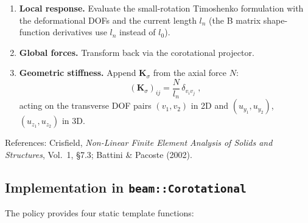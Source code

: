 \begin{enumerate}
  \item \textbf{Local response.}  Evaluate the small-rotation
    Timoshenko formulation with the deformational DOFs and the
    current length $l_n$ (the B matrix shape-function derivatives
    use $l_n$ instead of $l_0$).

  \item \textbf{Global forces.}  Transform back via the corotational
    projector.

  \item \textbf{Geometric stiffness.}  Append
    $\mathbf{K}_\sigma$ from the axial force $N$:
    \[
        (\mathbf{K}_\sigma)_{ij} =
        \frac{N}{l_n}\,\delta_{v_i v_j}\;,
    \]
    acting on the transverse DOF pairs $(v_1, v_2)$ in 2D and
    $(u_{y_1}, u_{y_2})$, $(u_{z_1}, u_{z_2})$ in 3D.
\end{enumerate}

\noindent
References: Crisfield, \emph{Non-Linear Finite Element Analysis of
Solids and Structures}, Vol.~1, \S7.3; Battini \& Pacoste (2002).

\subsection{Implementation in \texttt{beam::Corotational}}

The policy provides four static template functions:

